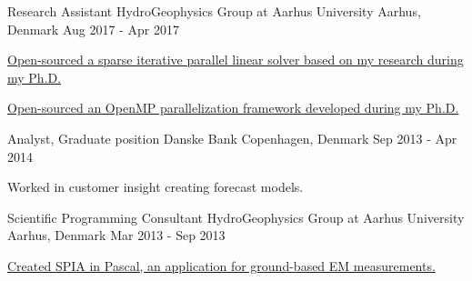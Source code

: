 \begin{cventries}
  \cventry
    {Research Assistant} %
    {HydroGeophysics Group at Aarhus University} %
    {Aarhus, Denmark} %
    {Aug 2017 - Apr 2017} %
    {
      \begin{cvitems} %
        \item {\href{https://github.com/tueboesen/Sparse-iterative-parallel-linear-solver}{Open-sourced a sparse iterative parallel linear solver based on my research during my Ph.D.}}
        \item {\href{https://github.com/tueboesen/Parallelization-Framework}{Open-sourced an OpenMP parallelization framework developed during my Ph.D.}}
      \end{cvitems}
    }

  \cventry
    {Analyst, Graduate position} %
    {Danske Bank} %
    {Copenhagen, Denmark} %
    {Sep 2013 - Apr 2014} %
    {
      \begin{cvitems} %
        \item {Worked in customer insight creating forecast models.}
      \end{cvitems}
    }

  \cventry
    {Scientific Programming Consultant} %
    {HydroGeophysics Group at Aarhus University} %
    {Aarhus, Denmark} %
    {Mar 2013 - Sep 2013} %
    {
      \begin{cvitems} %
        \item {\href{https://hgg.au.dk/software/spia}{Created SPIA in Pascal, an application for ground-based EM measurements.}}
      \end{cvitems}
    }


\end{cventries}

